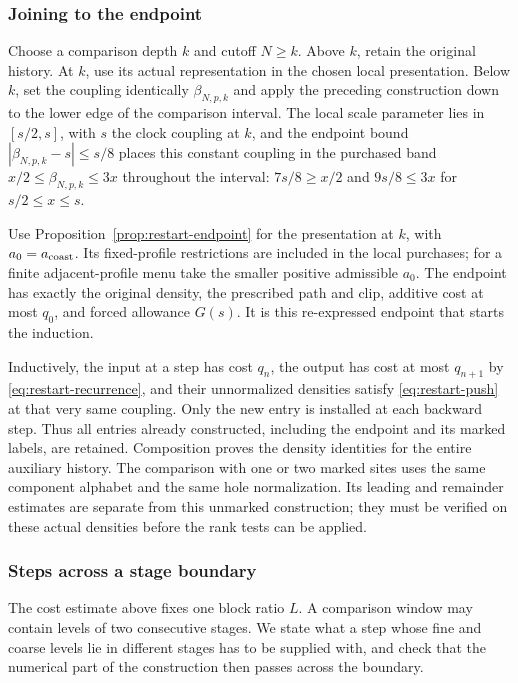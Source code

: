\subsubsection{Joining to the endpoint}

Choose a comparison depth $k$ and cutoff $N\ge k$. Above $k$, retain
the original history. At $k$, use its actual representation in the
chosen local presentation. Below $k$, set the coupling identically
$\beta_{N,p,k}$ and apply the preceding construction down to the lower
edge of the comparison interval. The local scale parameter lies in
$[s/2,s]$, with $s$ the clock coupling at $k$, and the endpoint bound
$|\beta_{N,p,k}-s|\le s/8$ places this constant coupling in the
purchased band $x/2\le\beta_{N,p,k}\le3x$ throughout the interval:
$7s/8\ge x/2$ and $9s/8\le3x$ for $s/2\le x\le s$.

Use Proposition~\ref{prop:restart-endpoint} for the presentation at $k$,
with $a_0=a_{\rm coast}$. Its fixed-profile restrictions are included in
the local purchases; for a finite adjacent-profile menu take the smaller
positive admissible $a_0$. The endpoint has exactly the original density,
the prescribed path and clip, additive cost at most $q_0$, and forced
allowance $G(s)$. It is this re-expressed endpoint that starts the
induction.

Inductively, the input at a step has cost $q_n$, the output has cost
at most $q_{n+1}$ by \eqref{eq:restart-recurrence}, and their unnormalized
densities satisfy \eqref{eq:restart-push} at that very same coupling.
Only the new entry is installed at each backward step. Thus all entries
already constructed, including the endpoint and its marked labels, are
retained. Composition proves the density identities for the entire
auxiliary history. The comparison with one or two marked sites uses the
same component alphabet and the same hole normalization. Its leading
and remainder estimates are separate from this unmarked construction;
they must be verified on these actual densities before the rank tests
can be applied.

\subsubsection{Steps across a stage boundary}
\label{subsec:restart-stage-boundary}

The cost estimate above fixes one block ratio $L$. A comparison window may
contain levels of two consecutive stages. We state what a step whose fine
and coarse levels lie in different stages has to be supplied with, and
check that the numerical part of the construction then passes across the
boundary.

